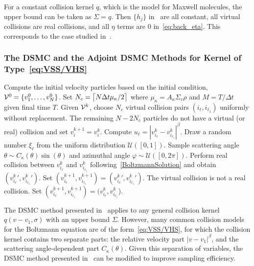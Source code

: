 \documentclass[12pt,nopreprintline]{elsarticle}
\DeclarePairedDelimiter{\ceil}{\lceil}{\rceil}
\begin{document}
For a constant collision kernel $q$, which is the model for Maxwell molecules, the upper bound can be taken as $\Sigma =q$. Then $\{h_j\}$ in~ are all constant, all virtual collisions are real collisions, and all $\eta$ terms are $0$ in~\eqref{eq:back_eta}. This corresponds to the case studied in~\cite{caflisch2021adjoint}.

\subsubsection{The DSMC and the Adjoint DSMC Methods for Kernel of Type~\eqref{eq:VSS/VHS}}\label{sec:algs13_discuss}

\begin{algorithm}
 \caption{DSMC Algorithm for Collision Kernel of Form~\eqref{eq:VSS/VHS} \label{alg:VHS_DSMC_2}}
\begin{algorithmic}[1]
\State Compute the initial velocity particles based on the initial condition, $\mathcal V^0 = \{v^0_1,\dots,v^0_N\}$. Set $N_c =\ceil[\big]{N \Delta t \mu_\kappa/2}$ where $\mu_\kappa = A_\kappa \Sigma_v \rho$ and $M=T/\Delta t$ given final time $T$. 
\State Given  $\mathcal V^{k}$, choose $N_c$ virtual collision pairs $(i_\ell,i_{\ell_1})$ uniformly without replacement. The remaining $N-2N_c$ particles do not have a virtual (or real) collision and set $v^{k+1}_{i} = v^{k}_{i}$.
\State Compute $u_\ell = |v^k_{i_{\ell}}-v^k_{i_{\ell_1}}|^\beta$.
\State Draw a random number $\xi_\ell$ from the uniform distribution $\mathcal{U}([0,1])$.
\State Sample scattering angle $\theta \sim C_\kappa (\theta)\sin(\theta)$ and azimuthal angle $\varphi\sim\mathcal{U}([0,2\pi])$.
\State Perform real collision between $ v^k_{i_{\ell }}$ and $v^k_{i_{\ell_1 }} $ following~\eqref{BoltzmannSolution} and obtain $({v^k_{i_{\ell }}}', {v^k_{i_{\ell_1}}}')$.
\State Set $(v^{k+1}_{i_{\ell }} , v^{k+1}_{i_{\ell_1}} ) = ({v^k_{i_{\ell }}}', {v^k_{i_{\ell_1}}}')$.
\Else 
\State The virtual collision is not a real collision. Set $( v^{k+1}_{i_{\ell }} , v^{k+1}_{i_{\ell_1}} ) = ({v^k_{i_{\ell }}}, {v^k_{i_{\ell_1}}}$).
\EndIf
\EndFor
\EndFor
\end{algorithmic}
\end{algorithm}

The DSMC method presented in~ applies to any general collision kernel $q(v-v_1, \sigma)$ with an upper bound $\Sigma$. However, many common collision models for the Boltzmann equation are of the form~\eqref{eq:VSS/VHS}, for which the collision kernel contains two separate parts: the relative velocity part $|v-v_1|^\beta$, and the scattering angle-dependent part $C_\kappa(\theta)$. Given this separation of variables, the DSMC method presented in~ can be modified to improve sampling efficiency. 
\end{document}
